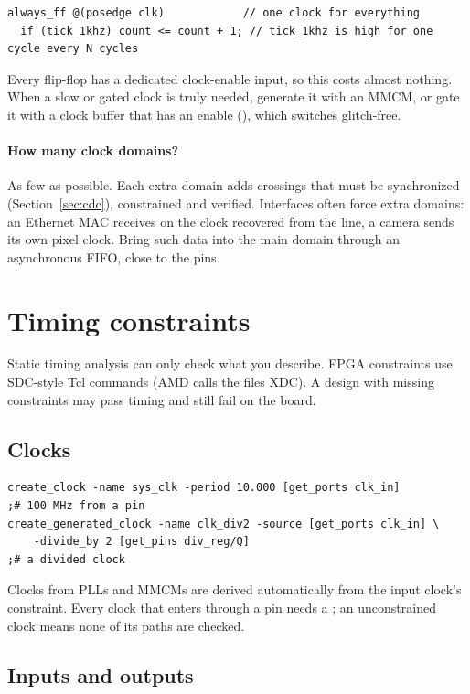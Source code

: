 \begin{lstlisting}
always_ff @(posedge clk)            // one clock for everything
  if (tick_1khz) count <= count + 1; // tick_1khz is high for one cycle every N cycles
\end{lstlisting}

Every flip-flop has a dedicated clock-enable input, so this costs almost nothing. When a slow or gated clock is truly needed, generate it with an MMCM, or gate it with a clock buffer that has an enable (), which switches glitch-free.

\paragraph{How many clock domains?} As few as possible. Each extra domain adds crossings that must be synchronized (Section~\ref{sec:cdc}), constrained and verified. Interfaces often force extra domains: an Ethernet MAC receives on the clock recovered from the line, a camera sends its own pixel clock. Bring such data into the main domain through an asynchronous FIFO, close to the pins.

\section{Timing constraints}

Static timing analysis can only check what you describe. FPGA constraints use SDC-style Tcl commands (AMD calls the files XDC). A design with missing constraints may pass timing and still fail on the board.

\subsection*{Clocks}

\begin{lstlisting}
create_clock -name sys_clk -period 10.000 [get_ports clk_in]          ;# 100 MHz from a pin
create_generated_clock -name clk_div2 -source [get_ports clk_in] \
    -divide_by 2 [get_pins div_reg/Q]                                   ;# a divided clock
\end{lstlisting}

Clocks from PLLs and MMCMs are derived automatically from the input clock's constraint. Every clock that enters through a pin needs a ; an unconstrained clock means none of its paths are checked.

\subsection*{Inputs and outputs}


